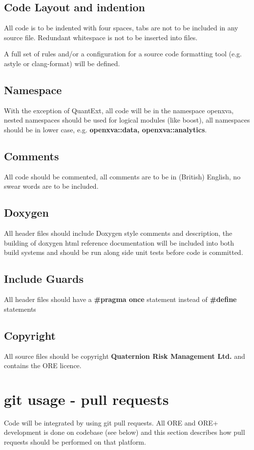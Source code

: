 \documentclass[12pt, a4paper]{article}
\begin{document}
\subsection*{Code Layout and indention}
All code is to be indented with four spaces, tabs are not to be included in any source file. Redundant whitespace is not to be inserted into files. 

\noindent
A full set of rules and/or a configuration for a source code formatting tool (e.g. astyle or clang-format) will be defined.

\subsection*{Namespace}
With the exception of QuantExt, all code will be in the namespace openxva, nested namespaces should be used for logical modules (like boost), all namespaces should be in lower case, e.g. \textbf{openxva::data, openxva::analytics}.

\subsection*{Comments}
All code should be commented, all comments are to be in (British) English, no swear words are to be included.

\subsection*{Doxygen}
All header files should include Doxygen style comments and description, the building of doxygen html reference documentation will be included into both build systems and should be run along side unit tests before code is committed.

\subsection*{Include Guards}
All header files should have a \textbf{\#pragma once} statement instead of \textbf{\#define} statements

\subsection*{Copyright}
All source files should be copyright \textbf{Quaternion Risk Management Ltd.} and contains the ORE licence.

\section*{git usage - pull requests}
Code will be integrated by using git pull requests. All ORE and ORE+ development is done on codebase (see below) and this section describes how pull requests should be performed on that platform.
\end{document}
